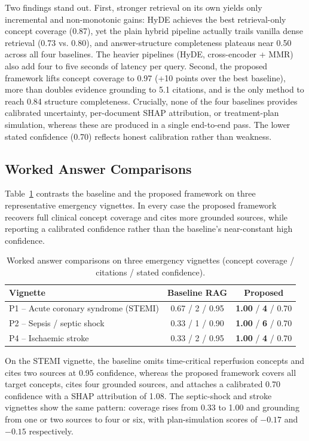Two findings stand out. First, stronger retrieval on its own yields only incremental and non-monotonic gains: HyDE achieves the best retrieval-only concept coverage (0.87), yet the plain hybrid pipeline actually trails vanilla dense retrieval (0.73 vs. 0.80), and answer-structure completeness plateaus near 0.50 across all four baselines. The heavier pipelines (HyDE, cross-encoder + MMR) also add four to five seconds of latency per query. Second, the proposed framework lifts concept coverage to 0.97 (+10 points over the best baseline), more than doubles evidence grounding to 5.1 citations, and is the only method to reach 0.84 structure completeness. Crucially, none of the four baselines provides calibrated uncertainty, per-document SHAP attribution, or treatment-plan simulation, whereas these are produced in a single end-to-end pass. The lower stated confidence (0.70) reflects honest calibration rather than weakness.

\subsection{Worked Answer Comparisons}

Table~\ref{tab:demo} contrasts the baseline and the proposed framework on three representative emergency vignettes. In every case the proposed framework recovers full clinical concept coverage and cites more grounded sources, while reporting a calibrated confidence rather than the baseline's near-constant high confidence.

\begin{table}[H]
\centering
\caption{Worked answer comparisons on three emergency vignettes (concept coverage / citations / stated confidence).}
\label{tab:demo}
\begin{tabular}{lcc}
\hline
\textbf{Vignette} & \textbf{Baseline RAG} & \textbf{Proposed} \\
\hline
P1 -- Acute coronary syndrome (STEMI) & 0.67 / 2 / 0.95 & \textbf{1.00} / \textbf{4} / 0.70 \\
P2 -- Sepsis / septic shock & 0.33 / 1 / 0.90 & \textbf{1.00} / \textbf{6} / 0.70 \\
P4 -- Ischaemic stroke & 0.33 / 2 / 0.95 & \textbf{1.00} / \textbf{4} / 0.70 \\
\hline
\end{tabular}
\end{table}

On the STEMI vignette, the baseline omits time-critical reperfusion concepts and cites two sources at 0.95 confidence, whereas the proposed framework covers all target concepts, cites four grounded sources, and attaches a calibrated 0.70 confidence with a SHAP attribution of 1.08. The septic-shock and stroke vignettes show the same pattern: coverage rises from 0.33 to 1.00 and grounding from one or two sources to four or six, with plan-simulation scores of $-0.17$ and $-0.15$ respectively.

